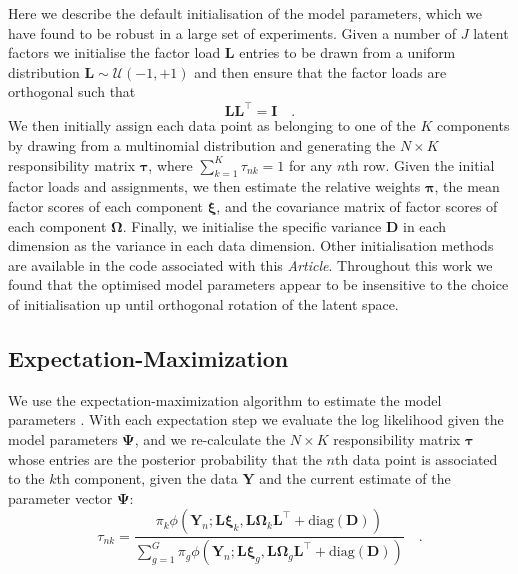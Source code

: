 \documentclass[twocolumn]{aastex62}
\newcommand{\vect}[1]{\boldsymbol{\mathbf{#1}}}
\renewcommand{\vec}[1]{\vect{#1}}
\newcommand{\weight}{\pi}
\newcommand{\data}{\textbf{Y}}
\newcommand{\vecdata}{\vec\data}
\newcommand{\diag}[1]{\textrm{diag}(#1)}
\newcommand{\transpose}{^\intercal}
\newcommand{\eye}{\textbf{I}}
\newcommand{\factorloads}{\textbf{L}}
\newcommand{\specificvariance}{\vec{D}}
\newcommand{\scoremeans}{\vec\xi}
\newcommand{\scorecovs}{\vec\Omega}
\newcommand{\NumData}{N}
\newcommand{\numdata}{n}
\newcommand{\NumLatentFactors}{J}
\newcommand{\NumComponents}{K}
\newcommand{\numcomponents}{k}
\begin{document}
Here we describe the default initialisation of the model parameters, which
we have found to be robust in a large set of experiments. Given a number of
$\NumLatentFactors$ latent factors we initialise the factor load
$\factorloads$ entries to be drawn from a uniform distribution
$\factorloads \sim \mathcal{U}\left(-1, +1\right)$ and then ensure that
the factor loads are orthogonal such that
\begin{equation}
	\factorloads \factorloads\transpose = \eye \quad .
\end{equation}
We then initially assign each data point as belonging to one of the
$\NumComponents$ components by drawing from a multinomial distribution
and generating the $\NumData \times \NumComponents$ responsibility matrix $\vec\tau$,
where $\sum_{k=1}^{K} \tau_{nk} = 1$ for any $n$th row. Given the initial
factor loads and assignments, we then estimate the relative weights
$\vec\pi$, the mean factor scores of each component $\scoremeans$, and
the covariance matrix of factor scores of each component $\scorecovs$.
Finally, we initialise the specific variance $\specificvariance$ in each
dimension as the variance in each data dimension. Other initialisation 
methods are available in the code associated with this \emph{Article}. 
Throughout this work we found that the optimised model parameters appear
to be insensitive to the choice of initialisation up until orthogonal
rotation of the latent space.


\subsection{Expectation-Maximization} \label{sec:expectation-maximization}

We use the expectation-maximization algorithm to estimate the model parameters
\citep{Dempster:1977}. With each expectation step we evaluate the log likelihood 
given the model parameters $\vec\Psi$, and we re-calculate the $\NumData \times \NumComponents$ responsibility 
matrix $\vec\tau$ whose entries are the posterior probability that the 
$\numdata$th data point is associated to the $\numcomponents$th component, given 
the data $\vecdata$ and the current estimate of the parameter vector $\vec\Psi$:
\begin{equation}
	\tau_{\numdata\numcomponents} = \frac{\weight_\numcomponents\phi(\vecdata_\numdata;\factorloads\scoremeans_\numcomponents, \factorloads\scorecovs_\numcomponents\factorloads\transpose + \diag{\specificvariance})}{\sum_{g=1}^{G}\weight_g\phi(\vecdata_\numdata;\factorloads\scoremeans_g, \factorloads\scorecovs_g\factorloads\transpose + \diag{\specificvariance})} \quad .
\end{equation}
\end{document}
